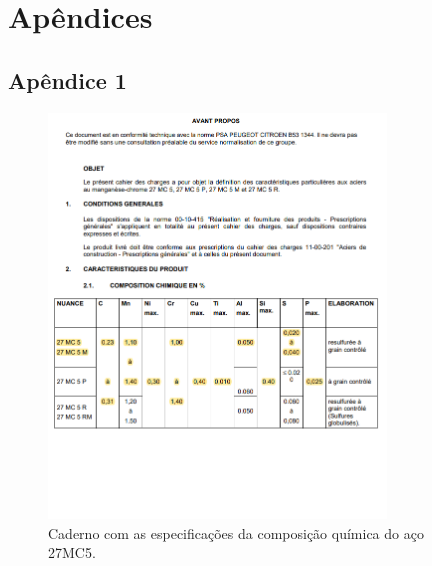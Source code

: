 \setlength{\headheight}{13.9pt}
\chapter{Apêndices} \label{ap:ap}
\section{Apêndice 1}\label{ap:comp_quimica_coroa}
\begin{figure}[htpb]
    \centering
    \includegraphics[width=0.8\textwidth]{Figures/Apendix/Chemical_Comp_Coroa.png}
    \caption{Caderno com as especificações da composição química do aço 27MC5.}
    \label{fig:chemical_comp_coroa}
\end{figure}
\newpage
